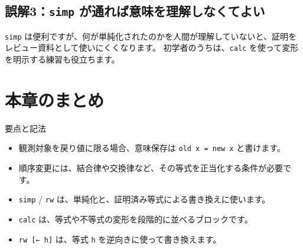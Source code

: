 \subsection{誤解3：\texttt{simp} が通れば意味を理解しなくてよい}

\texttt{simp} は便利ですが、何が単純化されたのかを人間が理解していないと、証明をレビュー資料として使いにくくなります。
初学者のうちは、\texttt{calc} を使って変形を明示する練習も役立ちます。

\section{本章のまとめ}

要点と記法
\begin{itemize}
\item 観測対象を戻り値に限る場合、意味保存は \texttt{old x = new x} と書けます。
\item 順序変更には、結合律や交換律など、その等式を正当化する条件が必要です。
\item \texttt{simp} / \texttt{rw} は、単純化と、証明済み等式による書き換えに使います。
\item \texttt{calc} は、等式や不等式の変形を段階的に並べるブロックです。
\item \texttt{rw [← h]} は、等式 \texttt{h} を逆向きに使って書き換えます。
\end{itemize}
